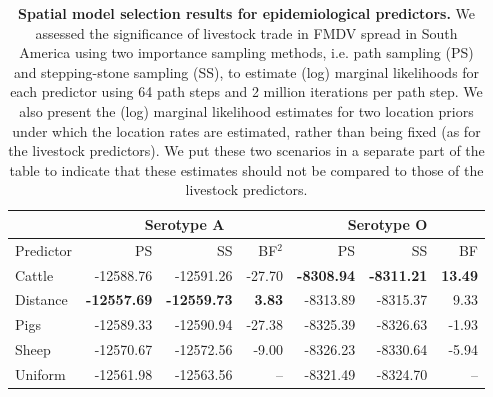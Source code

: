 \documentclass[10pt]{article}
\begin{document}
\newpage
\begin{table}[H]
\caption{
\textbf{Spatial model selection results for epidemiological predictors.}
We assessed the significance of livestock trade in FMDV spread in South America using two importance sampling methods, i.e. path sampling (PS) and stepping-stone sampling (SS), to estimate (log) marginal likelihoods for each predictor using 64 path steps and 2 million iterations per path step.
We also present the (log) marginal likelihood estimates for two location priors under which the location rates are estimated, rather than being fixed (as for the livestock predictors).
We put these two scenarios in a separate part of the table to indicate that these estimates should not be compared to those of the livestock predictors.
}
\begin{center}
\begin{tabular}{lrrrrrr}
\toprule
 & \multicolumn{3}{c}{Serotype A}& \multicolumn{3}{c}{Serotype O}\\
 \midrule
Predictor & PS & SS & BF$^2$ & PS & SS & BF \\
Cattle&-12588.76&-12591.26&-27.70&\textbf{-8308.94}&\textbf{-8311.21}& \textbf{13.49}\\
Distance&\textbf{-12557.69}&\textbf{-12559.73}&\textbf{3.83}&-8313.89&-8315.37&9.33\\
Pigs&-12589.33&-12590.94&-27.38&-8325.39&-8326.63&-1.93\\
Sheep&-12570.67&-12572.56&-9.00&-8326.23&-8330.64&-5.94\\
Uniform&-12561.98&-12563.56&--&-8321.49&-8324.70&--\\
\bottomrule
\end{tabular}
\end{center}
\begin{flushleft}
\end{flushleft}
\label{tab:preds}
 \end{table}
\newpage
\end{document}

